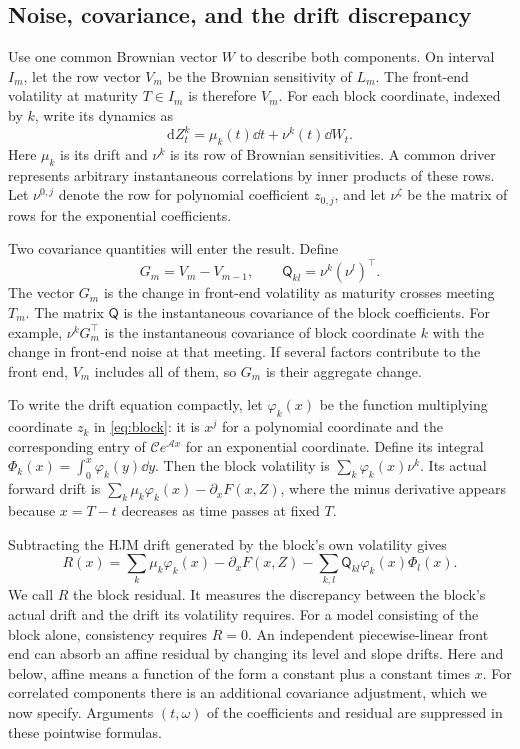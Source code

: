 \subsection{Noise, covariance, and the drift discrepancy}
Use one common Brownian vector $W$ to describe both components. On interval $I_m$, let the row vector $V_m$ be the Brownian sensitivity of $L_m$. The front-end volatility at maturity $T\in I_m$ is therefore $V_m$. For each block coordinate, indexed by $k$, write its dynamics as
\[
\mathrm dZ^k_t=\mu_k(t)\dd t+\nu^k(t)\dd W_t.
\]
Here $\mu_k$ is its drift and $\nu^k$ is its row of Brownian sensitivities. A common driver represents arbitrary instantaneous correlations by inner products of these rows. Let $\nu^{0,j}$ denote the row for polynomial coefficient $z_{0,j}$, and let $\nu^\zeta$ be the matrix of rows for the exponential coefficients.

Two covariance quantities will enter the result. Define
\[
G_m=V_m-V_{m-1},\qquad \mathsf Q_{kl}=\nu^k(\nu^l)^\top.
\]
The vector $G_m$ is the change in front-end volatility as maturity crosses meeting $T_m$. The matrix $\mathsf Q$ is the instantaneous covariance of the block coefficients. For example, $\nu^kG_m^\top$ is the instantaneous covariance of block coordinate $k$ with the change in front-end noise at that meeting. If several factors contribute to the front end, $V_m$ includes all of them, so $G_m$ is their aggregate change.

To write the drift equation compactly, let $\varphi_k(x)$ be the function multiplying coordinate $z_k$ in \eqref{eq:block}: it is $x^j$ for a polynomial coordinate and the corresponding entry of $\mathcal C e^{\mathcal A x}$ for an exponential coordinate. Define its integral $\Phi_k(x)=\int_0^x\varphi_k(y)\dd y$. Then the block volatility is $\sum_k\varphi_k(x)\nu^k$. Its actual forward drift is $\sum_k \mu_k\varphi_k(x)-\partial_xF(x,Z)$, where the minus derivative appears because $x=T-t$ decreases as time passes at fixed $T$.

Subtracting the HJM drift generated by the block's own volatility gives
\begin{equation}
R(x)=\sum_k \mu_k\varphi_k(x)-\partial_xF(x,Z)
       -\sum_{k,l}\mathsf Q_{kl}\varphi_k(x)\Phi_l(x).\label{eq:residual}
\end{equation}
We call $R$ the block residual. It measures the discrepancy between the block's actual drift and the drift its volatility requires. For a model consisting of the block alone, consistency requires $R=0$. An independent piecewise-linear front end can absorb an affine residual by changing its level and slope drifts. Here and below, affine means a function of the form a constant plus a constant times $x$. For correlated components there is an additional covariance adjustment, which we now specify. Arguments $(t,\omega)$ of the coefficients and residual are suppressed in these pointwise formulas.

